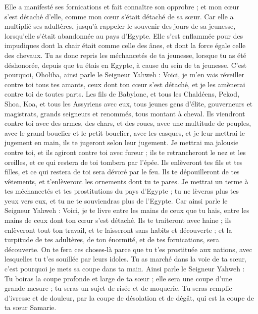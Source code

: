 \begin{multicols}{2}
Elle a manifesté ses fornications et fait connaître son opprobre ; et mon cœur s'est détaché d'elle, comme mon cœur s'était détaché de sa sœur.
Car elle a multiplié ses adultères, jusqu'à rappeler le souvenir des jours de sa jeunesse, lorsqu’elle s'était abandonnée au pays d'Egypte.
Elle s’est enflammée pour des impudiques dont la chair était comme celle des ânes, et dont la force égale celle des chevaux.
Tu as donc repris les méchancetés de ta jeunesse, lorsque tu as été déshonorée, depuis que tu étais en Egypte, à cause du sein de ta jeunesse.
C'est pourquoi, Oholiba, ainsi parle le Seigneur Yahweh : Voici, je m'en vais réveiller contre toi tous tes amants, ceux dont ton cœur s'est détaché, et je les amènerai contre toi de toutes parts.
Les fils de Babylone, et tous les Chaldéens, Pekod, Shoa, Koa, et tous les Assyriens avec eux, tous jeunes gens d'élite, gouverneurs et magistrats, grands seigneurs et renommés, tous montant à cheval.
Ils viendront contre toi avec des armes, des chars, et des roues, avec une multitude de peuples, avec le grand bouclier et le petit bouclier, avec les casques, et je leur mettrai le jugement en main, ils te jugeront selon leur jugement.
Je mettrai ma jalousie contre toi, et ils agiront contre toi avec fureur ; ils te retrancheront le nez et les oreilles, et ce qui restera de toi tombera par l'épée. Ils enlèveront tes fils et tes filles, et ce qui restera de toi sera dévoré par le feu.
Ils te dépouilleront de tes vêtements, et t’enlèveront les ornements dont tu te pares.
Je mettrai un terme à tes méchancetés et tes prostitutions du pays d'Egypte ; tu ne lèveras plus tes yeux vers eux, et tu ne te souviendras plus de l'Egypte.
Car ainsi parle le Seigneur Yahweh : Voici, je te livre entre les mains de ceux que tu hais, entre les mains de ceux dont ton cœur s'est détaché.
Ils te traiteront avec haine ; ils enlèveront tout ton travail, et te laisseront sans habits et découverte ; et la turpitude de tes adultères, de ton énormité, et de tes fornications, sera découverte.
On te fera ces choses-là parce que tu t'es prostituée aux nations, avec lesquelles tu t'es souillée par leurs idoles.
Tu as marché dans la voie de ta sœur, c'est pourquoi je mets sa coupe dans ta main.
Ainsi parle le Seigneur Yahweh : Tu boiras la coupe profonde et large de ta sœur ; elle sera une coupe d'une grande mesure ; tu seras un sujet de risée et de moquerie\FTNT{}.
Tu seras remplie d'ivresse et de douleur, par la coupe de désolation et de dégât, qui est la coupe de ta sœur Samarie.

\end{multicols}
